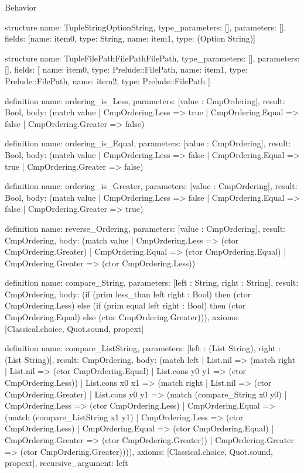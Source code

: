\begin{lexlean}{Behavior}
\begin{semanticmodule}
structure{
  name: TupleStringOptionString,
  type_parameters: [],
  parameters: [],
  fields: [{name: item0, type: String}, {name: item1, type: (Option String)}]
}

structure{
  name: TupleFilePathFilePathFilePath,
  type_parameters: [],
  parameters: [],
  fields: [
    {name: item0, type: Prelude::FilePath},
    {name: item1, type: Prelude::FilePath},
    {name: item2, type: Prelude::FilePath}
  ]
}

definition{
  name: ordering_is_Less,
  parameters: [value : CmpOrdering],
  result: Bool,
  body: (match value
    | CmpOrdering.Less => true
    | CmpOrdering.Equal => false
    | CmpOrdering.Greater => false)
}

definition{
  name: ordering_is_Equal,
  parameters: [value : CmpOrdering],
  result: Bool,
  body: (match value
    | CmpOrdering.Less => false
    | CmpOrdering.Equal => true
    | CmpOrdering.Greater => false)
}

definition{
  name: ordering_is_Greater,
  parameters: [value : CmpOrdering],
  result: Bool,
  body: (match value
    | CmpOrdering.Less => false
    | CmpOrdering.Equal => false
    | CmpOrdering.Greater => true)
}

definition{
  name: reverse_Ordering,
  parameters: [value : CmpOrdering],
  result: CmpOrdering,
  body: (match value
    | CmpOrdering.Less => (ctor CmpOrdering.Greater)
    | CmpOrdering.Equal => (ctor CmpOrdering.Equal)
    | CmpOrdering.Greater => (ctor CmpOrdering.Less))
}

definition{
  name: compare_String,
  parameters: [left : String, right : String],
  result: CmpOrdering,
  body: (if (prim less_than left right : Bool) then (ctor CmpOrdering.Less) else (if (prim equal left right : Bool) then (ctor CmpOrdering.Equal) else (ctor CmpOrdering.Greater))),
  axioms: [Classical.choice, Quot.sound, propext]
}

definition{
  name: compare_ListString,
  parameters: [left : (List String), right : (List String)],
  result: CmpOrdering,
  body: (match left
    | List.nil => (match right
      | List.nil => (ctor CmpOrdering.Equal)
      | List.cons y0 y1 => (ctor CmpOrdering.Less))
    | List.cons x0 x1 => (match right
      | List.nil => (ctor CmpOrdering.Greater)
      | List.cons y0 y1 => (match (compare_String x0 y0)
        | CmpOrdering.Less => (ctor CmpOrdering.Less)
        | CmpOrdering.Equal => (match (compare_ListString x1 y1)
          | CmpOrdering.Less => (ctor CmpOrdering.Less)
          | CmpOrdering.Equal => (ctor CmpOrdering.Equal)
          | CmpOrdering.Greater => (ctor CmpOrdering.Greater))
        | CmpOrdering.Greater => (ctor CmpOrdering.Greater)))),
  axioms: [Classical.choice, Quot.sound, propext],
  recursive_argument: left
}


\end{semanticmodule}
\end{lexlean}
